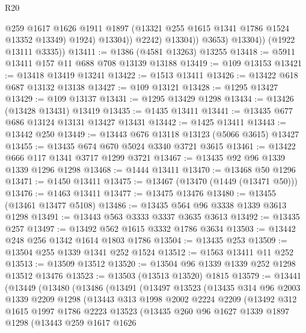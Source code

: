 \begin{lexlean}{R20}
\begin{coremodule}
                        @259
                        @1617
                        @1626
                        @1911
                        @1897
                        (@13321 @255 @1615 @1341 @1786 @1524 @13352 @13349)
                        @1924)
                      @13304))
                  @2242)
                @13304))
            @3653)
          @13304))
      (@1922 @13111 @3335))
@13411 := @1386 (@4581 @13263) @13255
@13418 := @5911 @13411 @157 @11 @688 @708 @13139 @13188
@13419 := @109 @13153
@13421 := @13418 @13419 @13241
@13422 := @1513 @13411
@13426 := @13422 @618 @687 @13132 @13138
@13427 := @109 @13121
@13428 := @1295 @13427
@13429 := @109 @13137
@13431 := @1295 @13429 @1298
@13434 := @13426 (@13428 @13431) @13419
@13435 := @1435 @13411
@13441 := @13435 @677 @686 @13124 @13131 @13427 @13431
@13442 := @1425 @13411
@13443 := @13442 @250
@13449 := @13443 @676 @13118 @13123 (@5066 @3615) @13427
@13455 := @13435 @674 @670 @5024 @3340 @3721 @3615
@13461 := @13422 @666 @117 @1341 @3717 @1299 @3721
@13467 := @13435 @92 @96 @1339 @1339 @1296 @1298
@13468 := @1444 @13411
@13470 := @13468 @50 @1296
@13471 := @1450 @13411
@13475 := @13467 (@13470 (@1449 (@13471 @50)))
@13476 := @1463 @13411
@13477 := @13475 @13476
@13480 := @13455 (@13461 @13477 @5108)
@13486 := @13435 @564 @96 @3338 @1339 @3613 @1298
@13491 := @13443 @563 @3333 @3337 @3635 @3613
@13492 := @13435 @257
@13497 := @13492 @562 @1615 @3332 @1786 @3634
@13503 := @13442 @248 @256 @1342 @1614 @1803 @1786
@13504 := @13435 @253
@13509 := @13504 @255 @1339 @1341 @252 @1524
@13512 := @1563 @13411 @11 @252
@13513 := @13509 @13512
@13520 := @13504 @96 @1339 @1339 @252 @1298 @13512 @13476
@13523 := @13503 (@13513 @13520) @1815
@13579 := @13441
    (@13449
      (@13480
        (@13486
          (@13491
            (@13497
              @13523
              (@13435
                @314
                @96
                @2003
                @1339
                @2209
                @1298
                (@13443
                  @313
                  @1998
                  @2002
                  @2224
                  @2209
                  (@13492
                    @312
                    @1615
                    @1997
                    @1786
                    @2223
                    @13523
                    (@13435
                      @260
                      @96
                      @1627
                      @1339
                      @1897
                      @1298
                      (@13443
                        @259
                        @1617
                        @1626

\end{coremodule}
\end{lexlean}

